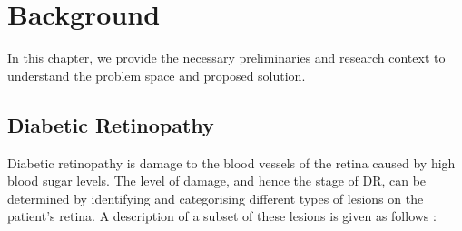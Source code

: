 \chapter{Background}



In this chapter, we provide the necessary preliminaries and research context to understand the problem space and proposed solution.

\section{Diabetic Retinopathy} \label{background:classifyingdr}

Diabetic retinopathy is damage to the blood vessels of the retina caused by high blood sugar levels. The level of damage, and hence the stage of DR, can be determined by identifying and categorising different types of lesions on the patient's retina. A description of a subset of these lesions is given as follows \cite{taylor2012handbook}:

